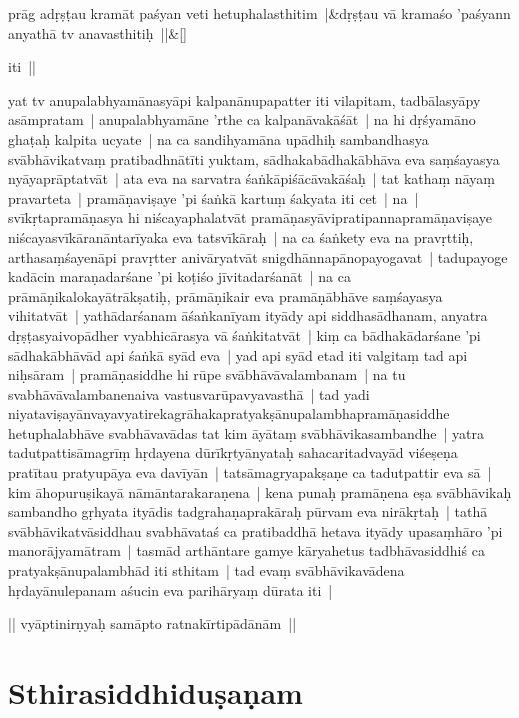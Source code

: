 \documentclass[article,12pt,a4paper]{memoir}
\begin{document}
	\pend
      
	    
	    \stanza[\smallbreak]
	prāg adṛṣṭau kramāt paśyan veti hetuphalasthitim |&dṛṣṭau vā kramaśo 'paśyann anyathā tv anavasthitiḥ ||\&[\smallbreak]


	

	  \pstart iti ||
	\pend
      

	  \pstart yat tv anupalabhyamānasyāpi kalpanānupapatter iti vilapitam, tadbālasyāpy asāmpratam | anupalabhyamāne 'rthe ca kalpanāvakāśāt | na hi dṛśyamāno ghaṭaḥ kalpita ucyate | na ca sandihyamāna upādhiḥ sambandhasya svābhāvikatvaṃ pratibadhnātīti yuktam, sādhakabādhakābhāva eva saṃśayasya nyāyaprāptatvāt | ata eva na sarvatra śaṅkāpiśācāvakāśaḥ | tat kathaṃ nāyaṃ pravarteta | \label{thakur75-111.9} pramāṇaviṣaye 'pi śaṅkā kartuṃ śakyata iti cet | na | svīkṛtapramāṇasya hi niścayaphalatvāt pramāṇasyāvipratipannapramāṇaviṣaye niścayasvīkāranāntarīyaka eva tatsvīkāraḥ | na ca śaṅkety eva na pravṛttiḥ, arthasaṃśayenāpi pravṛtter anivāryatvāt snigdhānnapānopayogavat | tadupayoge kadācin maraṇadarśane 'pi koṭiśo jīvitadarśanāt | na ca prāmāṇikalokayātrākṣatiḥ, prāmāṇikair eva pramāṇābhāve saṃśayasya vihitatvāt | yathādarśanam āśaṅkanīyam ityādy api siddhasādhanam, anyatra dṛṣṭasyaivopādher vyabhicārasya vā śaṅkitatvāt | kiṃ ca bādhakādarśane 'pi sādhakābhāvād api śaṅkā syād eva | \label{thakur75-111.17} yad api syād etad iti valgitaṃ tad api niḥsāram | pramāṇasiddhe hi rūpe svābhāvāvalambanam | na tu svabhāvāvalambanenaiva vastusvarūpavyavasthā | tad yadi niyataviṣayānvayavyatirekagrāhakapratyakṣānupalambhapramāṇasiddhe hetuphalabhāve svabhāvavādas tat kim āyātaṃ svābhāvikasambandhe | yatra tadutpattisāmagrīṃ hṛdayena dūrīkṛtyānyataḥ sahacaritadvayād viśeṣeṇa pratītau pratyupāya eva davīyān | tatsāmagryapakṣaṇe ca tadutpattir eva sā | kim āhopuruṣikayā nāmāntarakaraṇena | kena punaḥ pramāṇena eṣa svābhāvikaḥ sambandho gṛhyata ityādis tadgrahaṇaprakāraḥ pūrvam eva nirākṛtaḥ | tathā svābhāvikatvāsiddhau svabhāvataś ca pratibaddhā hetava ityādy upasaṃhāro 'pi manorājyamātram | tasmād arthāntare gamye kāryahetus tadbhāvasiddhiś ca pratyakṣānupalambhād iti sthitam | tad evaṃ svābhāvikavādena hṛdayānulepanam aśucin eva parihāryaṃ dūrata iti |
	\pend
      

	  \pstart || vyāptinirṇyaḥ samāpto ratnakīrtipādānām || 
	\pend
      
	  
	
\chapter[{Sthirasiddhiduṣaṇam}]{Sthirasiddhiduṣaṇam}\label{Sthirasiddhiduṣaṇam}
\end{document}
